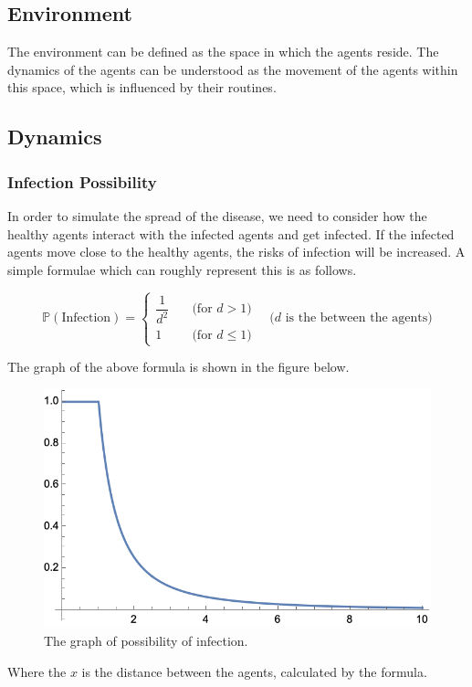 \documentclass[12pt]{article}
\begin{document}
\subsection{Environment}
The environment can be defined as the space in which the agents reside. The dynamics of the agents can be understood as the movement of the agents within this space, which is influenced by their routines.

\subsection{Dynamics}
\subsubsection{Infection Possibility}
In order to simulate the spread of the disease, we need to consider how the healthy agents interact with the infected agents and get infected.
If the infected agents move close to the healthy agents, the risks of infection will be increased. A simple formulae which can roughly represent this is as follows.

\[
\mathbb{P}(\text{Infection})=\begin{cases}
	\dfrac{1}{d^2} &\quad \text{(for $d > 1$)} \\
	1 &\quad \text{(for $d \leq 1$)}
\end{cases}\quad\text{($d$ is the between the agents)}
\]

The graph of the above formula is shown in the figure below.

\begin{figure}[h]
	\centering
	\includegraphics[width=0.7\linewidth]{./assets/infection-possibility-graph.png}
	\caption{The graph of possibility of infection.}
	\label{fig:infection-possibility-graph}
\end{figure}

Where the $x$ is the distance between the agents, calculated by the formula.
\end{document}
